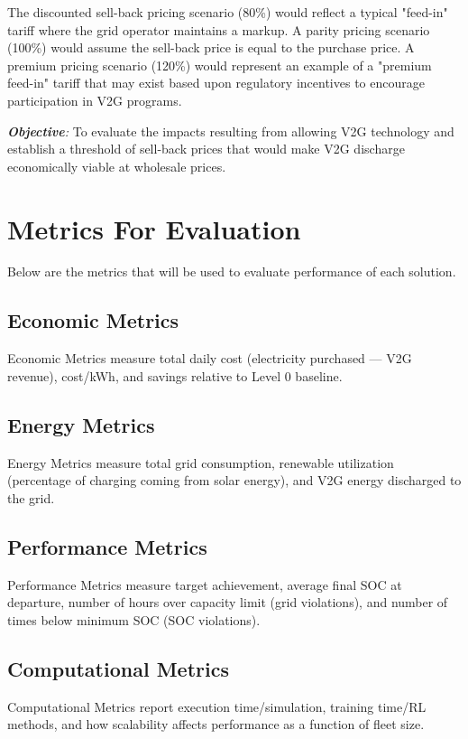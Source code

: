 The discounted sell-back pricing scenario (80\%) would reflect a typical "feed-in" tariff where the grid operator maintains a markup. A parity pricing scenario (100\%) would assume the sell-back price is equal to the purchase price. A premium pricing scenario (120\%) would represent an example of a "premium feed-in" tariff that may exist based upon regulatory incentives to encourage participation in V2G programs.

\textit{\textbf{Objective}: } To evaluate the impacts resulting from allowing V2G technology and establish a threshold of sell-back prices that would make V2G discharge economically viable at wholesale prices.\section{Metrics For Evaluation}
\label{sec:metrics}

Below are the metrics that will be used to evaluate performance of each solution.

\subsection{Economic Metrics}

Economic Metrics measure total daily cost (electricity purchased --- V2G revenue), cost/kWh, and savings relative to Level 0 baseline.

\subsection{Energy Metrics}

Energy Metrics measure total grid consumption, renewable utilization (percentage of charging coming from solar energy), and V2G energy discharged to the grid.

\subsection{Performance Metrics}

Performance Metrics measure target achievement, average final SOC at departure, number of hours over capacity limit (grid violations), and number of times below minimum SOC (SOC violations).

\subsection{Computational Metrics}

Computational Metrics report execution time/simulation, training time/RL methods, and how scalability affects performance as a function of fleet size.

